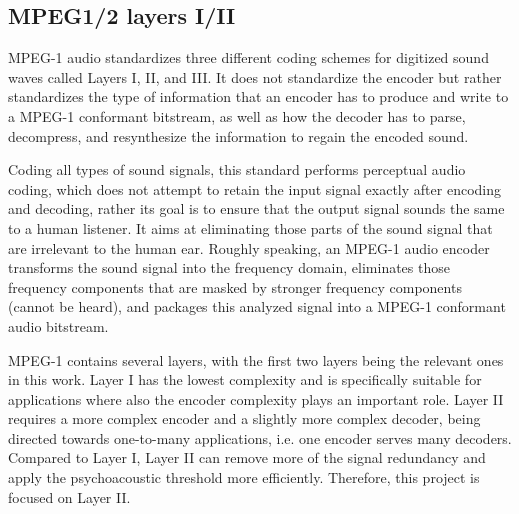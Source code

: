 

\subsection{MPEG1/2 layers I/II}

MPEG-1 audio standardizes three different coding schemes for digitized sound waves called Layers I, II, and III. It does not standardize the encoder but rather standardizes the type of information that an encoder has to produce and write to a MPEG-1 conformant bitstream, as well as how the decoder has to parse, decompress, and resynthesize the information to regain the encoded sound.

Coding all types of sound signals, this standard performs perceptual audio coding, which does not attempt to retain the input signal exactly after encoding and decoding, rather its goal is to ensure that the output signal sounds the same to a human listener. It aims at eliminating those parts of the sound signal that are irrelevant to the human ear. Roughly speaking, an MPEG-1 audio encoder transforms the sound signal into the frequency domain, eliminates those frequency components that are masked by stronger frequency components (cannot be heard), and packages this analyzed signal into a MPEG-1 conformant audio bitstream.

MPEG-1 contains several layers, with the first two layers being the relevant ones in this work.
Layer I has the lowest complexity and is specifically suitable for applications where also the encoder complexity plays an important role.
Layer II requires a more complex encoder and a slightly more complex decoder, being directed towards one-to-many applications, i.e. one encoder serves many decoders. Compared to Layer I, Layer II can remove more of the signal redundancy and apply the psychoacoustic threshold more efficiently. Therefore, this project is focused on Layer II.

